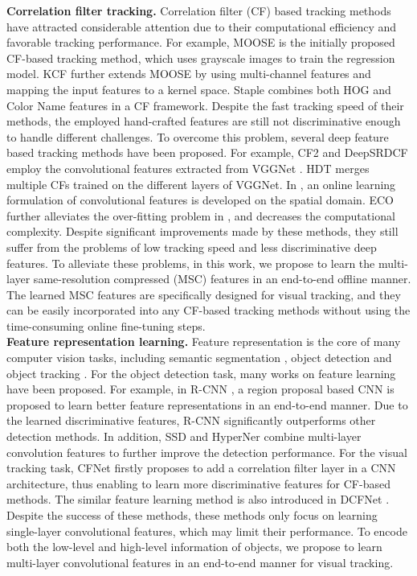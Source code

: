 \documentclass[runningheads]{llncs}
\begin{document}
\noindent \textbf{Correlation filter tracking.} Correlation filter (CF) based tracking methods \cite{DSST,CCOT,KCF} have attracted considerable attention due to their computational efficiency and favorable tracking performance. For example, MOOSE \cite{MOOSE} is the initially proposed CF-based tracking method, which uses grayscale images to train the regression model.  KCF \cite{KCF} further extends MOOSE by using multi-channel features and mapping the input features to a kernel space. Staple \cite{Staple} combines both HOG and Color Name features in a CF framework. Despite the fast tracking speed of their methods, the employed hand-crafted features are still not discriminative enough to handle different challenges. To overcome this problem, several deep feature based tracking methods have been proposed. For example, CF2 \cite{HCF} and DeepSRDCF \cite{DeepSRDCF} employ the convolutional features extracted from VGGNet \cite{VGG-M}. HDT \cite{HDT} merges multiple CFs trained on the different layers of VGGNet. In \cite{CCOT}, an online learning formulation of convolutional features is developed on the spatial domain. ECO \cite{ECO} further alleviates the over-fitting problem in \cite{CCOT}, and decreases the computational complexity. Despite significant improvements made by these methods, they still suffer from the problems of low tracking speed and less discriminative deep features. To alleviate these problems, in this work, we propose to learn the multi-layer same-resolution compressed (MSC) features in an end-to-end offline manner. The learned MSC features are specifically designed for visual tracking, and they can be easily incorporated into any CF-based tracking methods without using the time-consuming online fine-tuning steps. 
 \\

\noindent \textbf{Feature representation learning.} Feature representation is the core of many computer vision tasks, including semantic segmentation \cite{Deconv}, object detection \cite{YOLO} and object tracking \cite{Staple}. For the object detection task, many works on feature learning have been proposed. For example, in R-CNN \cite{R-CNN}, a region proposal based CNN is proposed to learn better feature representations in an end-to-end manner. Due to the learned discriminative features, R-CNN significantly outperforms other detection methods. In addition, SSD \cite{SSD} and HyperNer \cite{HyperNet} combine multi-layer convolution features to further improve the detection performance. For the visual tracking task, CFNet \cite{CFNet} firstly proposes to add a correlation filter layer in a CNN architecture, thus enabling to learn more discriminative features for CF-based methods. The similar feature learning method is also introduced in DCFNet \cite{DCFNet}. Despite the success of these methods, these methods only focus on learning single-layer convolutional features, which may limit their performance. To encode both the low-level and high-level information of objects, we propose to learn multi-layer convolutional features in an end-to-end manner for visual tracking. 
\end{document}
